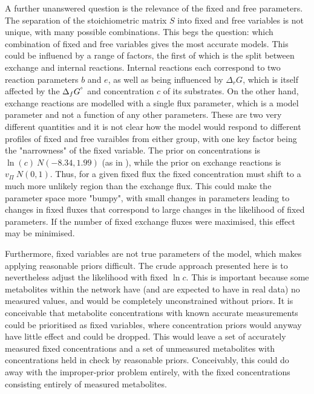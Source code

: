 \documentclass[10pt,letterpaper]{article}
\newcommand{\sdgf}{\Delta_fG^{\degree}}
\newcommand{\dgr}{\Delta_rG}
\begin{document}
A further unanswered question is the relevance of the fixed and free parameters.
The separation of the stoichiometric matrix $S$ into fixed and free variables is not unique, with many possible combinations.
This begs the question: which combination of fixed and free variables gives the most accurate models.
This could be influencd by a range of factors, the first of which is the split between exchange and internal reactions.
Internal reactions each correspond to two reaction parameters $b$ and $e$, as well as being influenced by $\dgr$, which is itself affected by the $\sdgf$ and concentration $c$ of its substrates.
On the other hand, exchange reactions are modelled with a single flux parameter, which is a model parameter and not a function of any other parameters.
These are two very different quantities and it is not clear how the model would respond to different profiles of fixed and free varaibles from either group, with one key factor being the "narrowness" of the fixed variable.
The prior on concentrations is $\ln(c) ~ N(-8.34, 1.99)$ (as in \cite{PTA}), while the prior on exchange reactions is $v_\Pi ~ N(0, 1)$. %
Thus, for a given fixed flux the fixed concentration must shift to a much more unlikely region than the exchange flux.
This could make the parameter space more "bumpy", with small changes in parameters leading to changes in fixed fluxes that correspond to large changes in the likelihood of fixed parameters.
If the number of fixed exchange fluxes were maximised, this effect may be minimised.

Furthermore, fixed variables are not true parameters of the model, which makes applying reasonable priors difficult.
The crude approach presented here is to nevertheless adjust the likelihood with fixed $\ln{c}$.
This is important because some metabolites within the network have (and are expected to have in real data) no measured values, and would be completely unconstrained without priors.
It is conceivable that metabolite concentrations with known accurate measurements could be prioritised as fixed variables, where concentration priors would anyway have little effect and could be dropped.
This would leave a set of accurately measured fixed concentrations and a set of unmeasured metabolites with concentrations held in check by reasonable priors.
Conceivably, this could do away with the improper-prior problem entirely, with the fixed concentrations consisting entirely of measured metabolites.
\end{document}
